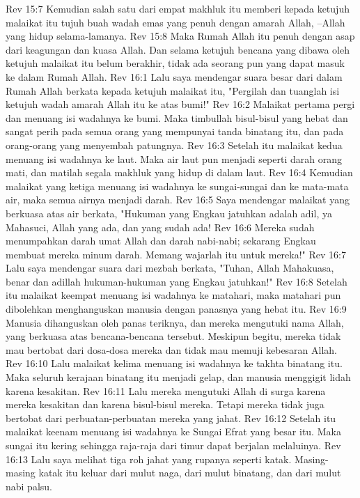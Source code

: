 Rev 15:7  Kemudian salah satu dari empat makhluk itu memberi kepada ketujuh malaikat itu tujuh buah wadah emas yang penuh dengan amarah Allah, --Allah yang hidup selama-lamanya.
Rev 15:8  Maka Rumah Allah itu penuh dengan asap dari keagungan dan kuasa Allah. Dan selama ketujuh bencana yang dibawa oleh ketujuh malaikat itu belum berakhir, tidak ada seorang pun yang dapat masuk ke dalam Rumah Allah.
Rev 16:1  Lalu saya mendengar suara besar dari dalam Rumah Allah berkata kepada ketujuh malaikat itu, "Pergilah dan tuanglah isi ketujuh wadah amarah Allah itu ke atas bumi!"
Rev 16:2  Malaikat pertama pergi dan menuang isi wadahnya ke bumi. Maka timbullah bisul-bisul yang hebat dan sangat perih pada semua orang yang mempunyai tanda binatang itu, dan pada orang-orang yang menyembah patungnya.
Rev 16:3  Setelah itu malaikat kedua menuang isi wadahnya ke laut. Maka air laut pun menjadi seperti darah orang mati, dan matilah segala makhluk yang hidup di dalam laut.
Rev 16:4  Kemudian malaikat yang ketiga menuang isi wadahnya ke sungai-sungai dan ke mata-mata air, maka semua airnya menjadi darah.
Rev 16:5  Saya mendengar malaikat yang berkuasa atas air berkata, "Hukuman yang Engkau jatuhkan adalah adil, ya Mahasuci, Allah yang ada, dan yang sudah ada!
Rev 16:6  Mereka sudah menumpahkan darah umat Allah dan darah nabi-nabi; sekarang Engkau membuat mereka minum darah. Memang wajarlah itu untuk mereka!"
Rev 16:7  Lalu saya mendengar suara dari mezbah berkata, "Tuhan, Allah Mahakuasa, benar dan adillah hukuman-hukuman yang Engkau jatuhkan!"
Rev 16:8  Setelah itu malaikat keempat menuang isi wadahnya ke matahari, maka matahari pun dibolehkan menghanguskan manusia dengan panasnya yang hebat itu.
Rev 16:9  Manusia dihanguskan oleh panas teriknya, dan mereka mengutuki nama Allah, yang berkuasa atas bencana-bencana tersebut. Meskipun begitu, mereka tidak mau bertobat dari dosa-dosa mereka dan tidak mau memuji kebesaran Allah.
Rev 16:10  Lalu malaikat kelima menuang isi wadahnya ke takhta binatang itu. Maka seluruh kerajaan binatang itu menjadi gelap, dan manusia menggigit lidah karena kesakitan.
Rev 16:11  Lalu mereka mengutuki Allah di surga karena mereka kesakitan dan karena bisul-bisul mereka. Tetapi mereka tidak juga bertobat dari perbuatan-perbuatan mereka yang jahat.
Rev 16:12  Setelah itu malaikat keenam menuang isi wadahnya ke Sungai Efrat yang besar itu. Maka sungai itu kering sehingga raja-raja dari timur dapat berjalan melaluinya.
Rev 16:13  Lalu saya melihat tiga roh jahat yang rupanya seperti katak. Masing-masing katak itu keluar dari mulut naga, dari mulut binatang, dan dari mulut nabi palsu.
